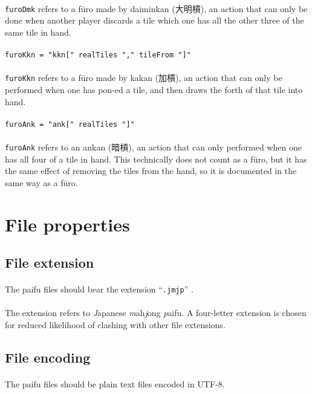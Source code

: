 \documentclass[%
	a4paper%
	,10pt%
	,twoside%
	,notitlepage%
]{article}%
\newcommand*{\ruleSymbol}{\textjapanese{⚠}}%
\newcommand*{\ruleMargin}{\marginpar{\flushright{}\ruleSymbol{}}}%
\newcommand*{\rulePar}{\paragraph*{\ruleMargin{}}}%
\begin{document}
			\paragraph*{}\lstinline/furoDmk/ refers to a f\={u}ro made by daiminkan (\textjapanese{大明槓}), an action that can only be done when another player discards a tile which one has all the other three of the same tile in hand. %
			\rulePar{}\lstinline/furoKkn = "kkn[" realTiles "," tileFrom "]"/%
			\paragraph*{}\lstinline/furoKkn/ refers to a f\={u}ro made by kakan (\textjapanese{加槓}), an action that can only be performed when one has pon-ed a tile, and then draws the forth of that tile into hand. %
			\rulePar{}\lstinline/furoAnk = "ank[" realTiles "]"/%
			\paragraph*{}\lstinline/furoAnk/ refers to an ankan (\textjapanese{暗槓}), an action that can only performed when one has all four of a tile in hand. This technically does not count as a f\={u}ro, but it has the same effect of removing the tiles from the hand, so it is documented in the same way as a f\={u}ro. %
\section{File properties}\label{sec:fileprop}%
% 
	\subsection{File extension}%
		\rulePar{}The paifu files should bear the extension ``\texttt{.jmjp}'' . %
		\paragraph*{}The extension refers to \textit{J\/}apanese \textit{m\/}ah\textit{j\/}ong \textit{p\/}aifu. A four-letter extension is chosen for reduced likelihood of clashing with other file extensions. %
	\subsection{File encoding}%
		\rulePar{}The paifu files should be plain text files encoded in UTF-8. %
\end{document}
